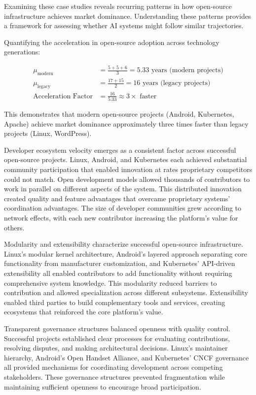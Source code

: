 Examining these case studies reveals recurring patterns in how open-source infrastructure achieves market dominance. Understanding these patterns provides a framework for assessing whether AI systems might follow similar trajectories.

Quantifying the acceleration in open-source adoption across technology generations:

\begin{align}
\mu_{\text{modern}} &= \frac{5 + 5 + 6}{3} = 5.33 \text{ years (modern projects)} \label{eq:modern_mean}\\
\mu_{\text{legacy}} &= \frac{17 + 15}{2} = 16 \text{ years (legacy projects)} \label{eq:legacy_mean}\\
\text{Acceleration Factor} &= \frac{16}{5.33} \approx 3\times \text{ faster} \label{eq:acceleration}
\end{align}

This demonstrates that modern open-source projects (Android, Kubernetes, Apache) achieve market dominance approximately three times faster than legacy projects (Linux, WordPress).

Developer ecosystem velocity emerges as a consistent factor across successful open-source projects. Linux, Android, and Kubernetes each achieved substantial community participation that enabled innovation at rates proprietary competitors could not match. Open development models allowed thousands of contributors to work in parallel on different aspects of the system. This distributed innovation created quality and feature advantages that overcame proprietary systems' coordination advantages. The size of developer communities grew according to network effects, with each new contributor increasing the platform's value for others.

Modularity and extensibility characterize successful open-source infrastructure. Linux's modular kernel architecture, Android's layered approach separating core functionality from manufacturer customization, and Kubernetes' API-driven extensibility all enabled contributors to add functionality without requiring comprehensive system knowledge. This modularity reduced barriers to contribution and allowed specialization across different subsystems. Extensibility enabled third parties to build complementary tools and services, creating ecosystems that reinforced the core platform's value.

Transparent governance structures balanced openness with quality control. Successful projects established clear processes for evaluating contributions, resolving disputes, and making architectural decisions. Linux's maintainer hierarchy, Android's Open Handset Alliance, and Kubernetes' CNCF governance all provided mechanisms for coordinating development across competing stakeholders. These governance structures prevented fragmentation while maintaining sufficient openness to encourage broad participation.

